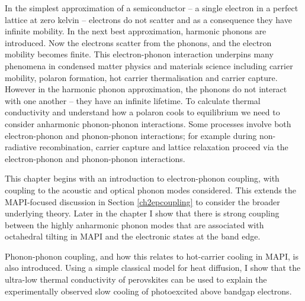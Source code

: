 In the simplest approximation of a semiconductor -- a single electron in a perfect lattice at zero kelvin -- electrons do not scatter and as a consequence they have infinite mobility. In the next best approximation, harmonic phonons are introduced. Now the electrons scatter from the phonons, and the electron mobility becomes finite. This electron-phonon interaction underpins many phenomena in condensed matter physics and materials science including carrier mobility, polaron formation, hot carrier thermalisation and carrier capture. However in the harmonic phonon approximation, the phonons do not interact with one another -- they have an infinite lifetime. To calculate thermal conductivity and understand how a polaron cools to equilibrium we need to consider anharmonic phonon-phonon interactions. Some processes involve both electron-phonon and phonon-phonon interactions; for example during non-radiative recombination, carrier capture and lattice relaxation proceed via the electron-phonon and phonon-phonon interactions. 

This chapter begins with an introduction to electron-phonon coupling, with coupling to the acoustic and optical phonon modes considered. This extends the MAPI-focused discussion in Section \ref{ch2epcoupling} to consider the broader underlying theory. Later in the chapter I show that there is strong coupling between the highly anharmonic phonon modes that are associated with octahedral tilting in MAPI and the electronic states at the band edge. 

Phonon-phonon coupling, and how this relates to hot-carrier cooling in MAPI, is also introduced. Using a simple classical model for heat diffusion, I show that the ultra-low thermal conductivity of perovskites can be used to explain the experimentally observed slow cooling of photoexcited above bandgap electrons.


